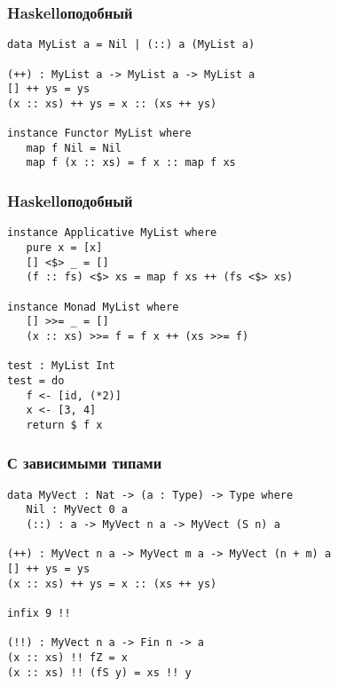 
\begin{frame}[fragile]
   \frametitle{Haskellоподобный}
   \begin{lstlisting}
data MyList a = Nil | (::) a (MyList a)

(++) : MyList a -> MyList a -> MyList a
[] ++ ys = ys
(x :: xs) ++ ys = x :: (xs ++ ys)

instance Functor MyList where
   map f Nil = Nil
   map f (x :: xs) = f x :: map f xs
   \end{lstlisting}
\end{frame}

\begin{frame}[fragile]
   \frametitle{Haskellоподобный}
   \begin{lstlisting}
instance Applicative MyList where
   pure x = [x]
   [] <$> _ = []
   (f :: fs) <$> xs = map f xs ++ (fs <$> xs)

instance Monad MyList where
   [] >>= _ = []
   (x :: xs) >>= f = f x ++ (xs >>= f)

test : MyList Int
test = do
   f <- [id, (*2)]
   x <- [3, 4]
   return $ f x
   \end{lstlisting}
\end{frame}

\begin{frame}[fragile]
   \frametitle{С зависимыми типами}
   \begin{lstlisting}
data MyVect : Nat -> (a : Type) -> Type where
   Nil : MyVect 0 a
   (::) : a -> MyVect n a -> MyVect (S n) a

(++) : MyVect n a -> MyVect m a -> MyVect (n + m) a
[] ++ ys = ys
(x :: xs) ++ ys = x :: (xs ++ ys)

infix 9 !!

(!!) : MyVect n a -> Fin n -> a
(x :: xs) !! fZ = x
(x :: xs) !! (fS y) = xs !! y
   \end{lstlisting}
\end{frame}

